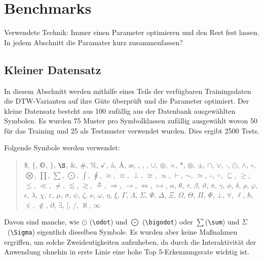 \chapter{Benchmarks} %
\label{cha:benchmarks}

\TODO Verwendete Technik: Immer einen Parameter optimieren und den Rest fest lassen.
\TODO In jedem Abschnitt die Paramater kurz zusammenfassen?

\section{Kleiner Datensatz}
\label{sec:kleiner_datensatz}

In diesem Abschnitt werden mithilfe eines Teils der verfügbaren Trainingsdaten die DTW-Varianten auf ihre Güte überprüft und die Parameter optimiert. Der kleine Datensatz besteht aus 100 zufällig aus der Datenbank ausgewählten Symbolen.
Es wurden 75 Muster pro Symbolklassen zufällig ausgewählt wovon 50 für das Training und 25 als Testmuster verwendet wurden. Dies ergibt 2500 Tests.

Folgende Symbole werden verwendet:

\begin{quote}
$\$$,
$\{$,
$\copyright$,
$\}$,
$\S$,
$\&$,
$\#$,
$\%$,
$\checkmark$,
\aa,
\AA,
\ae,
\DH,
\DJ,
\EUR,
$\cup$,
$\oplus$,
$\times$,
$\ast$,
$\otimes$,
$\pm$,
$\cap$,
$\vee$,
$\cdot$,
$\odot$,
$\wedge$,
$\circ$,
$\bigotimes$,
$\prod$,
$\sum$,
$\bigodot$,
$\int$,
$\oint$,
$\approx$,
$\equiv$,
$\perp$,
$\cong$,
$\propto$,
$\vdash$,
$\sim$,
$\simeq$,
$\therefore$,
$\because$,
$\subseteq$,
$\geq$,
$\leq$,
$\ll$,
$\neq$,
$\lesssim$,
$\gtrsim$,
$\triangleq$,
$\Rightarrow$,
$\rightarrow$,
$\Leftrightarrow$,
$\mapsto$,
$\alpha$,
$\theta$,
$\tau$,
$\beta$,
$\vartheta$,
$\pi$,
$\gamma$,
$\phi$,
$\delta$,
$\rho$,
$\varphi$,
$\epsilon$,
$\lambda$,
$\chi$,
$\varepsilon$,
$\mu$,
$\sigma$,
$\psi$,
$\zeta$,
$\nu$,
$\omega$,
$\eta$,
$\xi$,
$\Gamma$,
$\Lambda$,
$\Sigma$,
$\Psi$,
$\Delta$,
$\Xi$,
$\Omega$,
$\Theta$,
$\Pi$,
$\Phi$,
$\bot$,
$\forall$,
$\ell$,
$\hbar$,
$\in$,
$\not\in$,
$\partial$,
$\exists$,
$[$,
$/$,
$\aleph$,
$\infty$
\end{quote}

Davon sind manche, wie $\odot$ (\verb!\odot!) und $\bigodot$ (\verb!\bigodot!) oder $\sum$(\verb!\sum!) und $\Sigma$~(\verb!\Sigma!) eigentlich dieselben Symbole. Es wurden aber keine Maßnahmen ergriffen, um solche Zweideutigkeiten aufzuheben, da durch die Interaktivität der Anwendung ohnehin in erste Linie eine hohe Top 5-Erkennungsrate wichtig ist.

